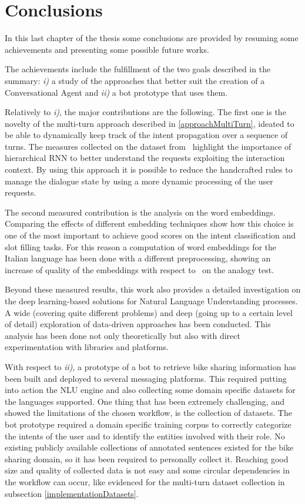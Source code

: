 
\chapter{Conclusions}
\label{conclusion}

In this last chapter of the thesis some conclusions are provided by resuming some achievements and presenting some possible future works.

The achievements include the fulfillment of the two goals described in the summary: \textit{i)} a study of the approaches that better suit the creation of a Conversational Agent and \textit{ii)} a bot prototype that uses them.

Relatively to \textit{i)}, the major contributions are the following. The first one is the novelty of the multi-turn approach described in \ref{approachMultiTurn}, ideated to be able to dynamically keep track of the intent propagation over a sequence of turns. The measures collected on the dataset from~\cite{eric2017key} highlight the importance of hierarchical RNN to better understand the requests exploiting the interaction context. By using this approach it is possible to reduce the handcrafted rules to manage the dialogue state by using a more dynamic processing of the user requests.

The second measured contribution is the analysis on the word embeddings. Comparing the effects of different embedding techniques show how this choice is one of the most important to achieve good scores on the intent classification and slot filling tasks. For this reason a computation of word embeddings for the Italian language has been done with a different preprocessing, showing an increase of quality of the embeddings with respect to~\cite{berardi2015word} on the analogy test.

Beyond these measured results, this work also provides a detailed investigation on the deep learning-based solutions for Natural Language Understanding processes. A wide (covering quite different problems) and deep (going up to a certain level of detail) exploration of data-driven approaches has been conducted. This analysis has been done not only theoretically but also with direct experimentation with libraries and platforms.

With respect to \textit{ii)}, a prototype of a bot to retrieve bike sharing information has been built and deployed to several messaging platforms. This required putting into action the NLU engine and also collecting some domain specific datasets for the languages supported. One thing that has been extremely challenging, and showed the limitations of the chosen workflow, is the collection of datasets. The bot prototype required a domain specific training corpus to correctly categorize the intents of the user and to identify the entities involved with their role. No existing publicly available collections of annotated sentences existed for the bike sharing domain, so it has been required to personally collect it. Reaching good size and quality of collected data is not easy and some circular dependencies in the workflow can occur, like evidenced for the multi-turn dataset collection in subsection \ref{implementationDatasets}.

